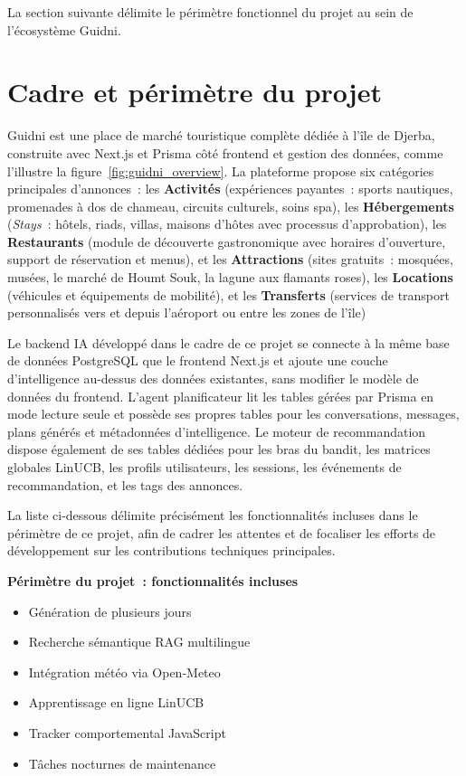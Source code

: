 La section suivante délimite le périmètre fonctionnel du projet au sein de l'écosystème Guidni.


\section{Cadre et périmètre du projet}

Guidni est une place de marché touristique complète dédiée à l'île de Djerba, construite avec
Next.js et Prisma côté frontend et gestion des données, comme l'illustre la figure~\ref{fig:guidni_overview}. La plateforme propose six catégories
principales d'annonces~: les \textbf{Activités} (expériences payantes~: sports nautiques,
promenades à dos de chameau, circuits culturels, soins spa), les \textbf{Hébergements}
(\textit{Stays}~: hôtels, riads, villas, maisons d'hôtes avec processus d'approbation), les 
\textbf{Restaurants} (module de découverte gastronomique avec horaires d'ouverture,
support de réservation et menus), et les \textbf{Attractions} (sites gratuits~: mosquées, musées,
 le marché de Houmt Souk, la lagune aux flamants roses), les \textbf{Locations} (véhicules et équipements de mobilité), 
 et les \textbf{Transferts} (services de transport personnalisés vers et depuis l'aéroport ou entre les zones de l'île)

Le backend IA développé dans le cadre de ce projet se connecte à la même base de données
PostgreSQL que le frontend Next.js et ajoute une couche d'intelligence au-dessus des données
existantes, sans modifier le modèle de données du frontend. L'agent planificateur lit les tables
gérées par Prisma en mode lecture seule et possède ses propres tables pour les conversations,
messages, plans générés et métadonnées d'intelligence. Le moteur de recommandation dispose
également de ses tables dédiées pour les bras du bandit, les matrices globales LinUCB, les profils
utilisateurs, les sessions, les événements de recommandation, et les tags des annonces.

La liste ci-dessous délimite précisément les fonctionnalités incluses dans le périmètre de ce projet, 
afin de cadrer les attentes et de focaliser les efforts de développement sur les contributions techniques principales.

\textbf{Périmètre du projet~: fonctionnalités incluses}
\begin{itemize}
    \item Génération de plusieurs jours
    \item Recherche sémantique RAG multilingue
    \item Intégration météo via Open-Meteo
    \item Apprentissage en ligne LinUCB
    \item Tracker comportemental JavaScript
    \item Tâches nocturnes de maintenance
\end{itemize}

